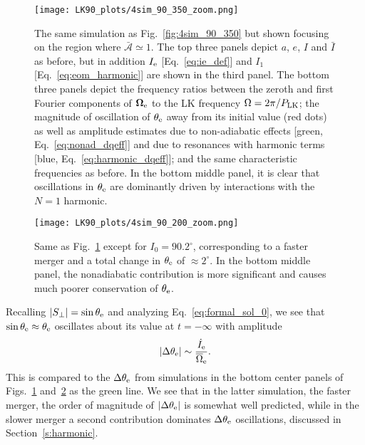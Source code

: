 \documentclass[
        twocolumn,
        twocolappendix
    ]{aastex63}
\newcommand*{\abs}[1]{\left|#1\right|}
\renewcommand*{\bm}[1]{\boldsymbol{\mathbf{#1}}}
\begin{document}
\begin{figure*}
    \centering
    \texttt{[image: LK90\_plots/4sim\_90\_350\_zoom.png]}
    \caption{The same simulation as Fig.~\ref{fig:4sim_90_350} but shown
    focusing on the region where $\bar{\mathcal{A}} \simeq 1$. The top three
    panels depict $a$, $e$, $I$ and $\bar{I}$ as before, but in addition $I_{\rm
    e}$ [Eq.~\eqref{eq:ie_def}] and $I_1$ [Eq.~\eqref{eq:eom_harmonic}]
    are shown in the third panel. The bottom three panels depict the frequency
    ratios between the zeroth and first Fourier components of $\bm{\Omega}_{\rm
    e}$ to the LK frequency $\Omega = 2\pi / P_{\rm LK}$; the magnitude of
    oscillation of $\theta_{\rm e}$ away from its initial value (red dots) as
    well as amplitude estimates due to non-adiabatic effects [green,
    Eq.~\eqref{eq:nonad_dqeff}] and due to resonances with harmonic terms [blue,
    Eq.~\eqref{eq:harmonic_dqeff}]; and the same characteristic frequencies as
    before. In the bottom middle panel, it is clear that oscillations in
    $\theta_{\rm e}$ are dominantly driven by interactions with the $N = 1$
    harmonic.}\label{fig:4sim_90_350_zoom}
\end{figure*}

\begin{figure*}
    \centering
    \texttt{[image: LK90\_plots/4sim\_90\_200\_zoom.png]}
    \caption{Same as Fig.~\ref{fig:4sim_90_350_zoom} except for $I_0 =
    90.2^\circ$, corresponding to a faster merger and a total change in
    $\theta_{\rm e}$ of $\approx 2^\circ$. In the bottom middle panel, the
    nonadiabatic contribution is more significant and causes much poorer
    conservation of $\theta_{\rm e}$.}\label{fig:4sim_90_200_zoom}
\end{figure*}

Recalling $\abs{S_{\perp}} = \sin \theta_{\rm e}$ and analyzing
Eq.~\eqref{eq:formal_sol_0}, we see that $\sin \theta_{\rm e} \approx
\theta_{\rm e}$ oscillates about its value at $t = -\infty$ with amplitude
\begin{equation}
    \abs{\Delta \theta_{\rm e}} \sim
        \frac{\dot{I}_{\rm e}}{\overline{\Omega}_{\rm e}}.\label{eq:nonad_dqeff}
\end{equation}
This is compared to the $\Delta \theta_{\rm e}$ from simulations in the bottom
center panels of Figs.~\ref{fig:4sim_90_350_zoom} and~\ref{fig:4sim_90_200_zoom}
as the green line. We see that in the latter simulation, the faster merger, the
order of magnitude of $\abs{\Delta \theta_{\rm e}}$ is somewhat well predicted,
while in the slower merger a second contribution dominates $\Delta \theta_{\rm
e}$ oscillations, discussed in Section~\ref{s:harmonic}.
\end{document}
